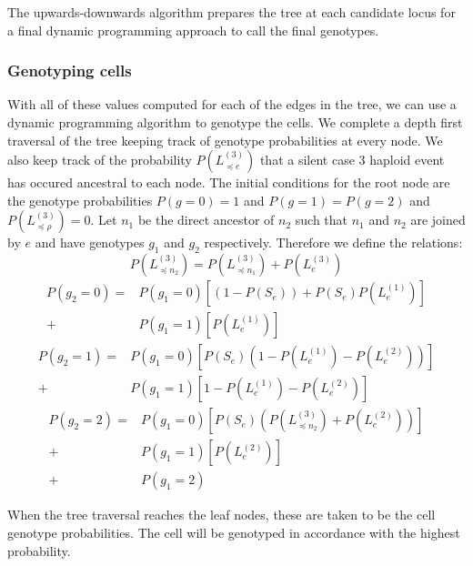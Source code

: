 \documentclass[../../main.tex]{subfiles}
\begin{document}
The upwards-downwards algorithm prepares the tree at each candidate locus for a final dynamic programming approach to call the final genotypes.

\subsubsection*{Genotyping cells}
With all of these values computed for each of the edges in the tree, we can use a dynamic programming algorithm to genotype the cells. We complete a depth first traversal of the tree keeping track of genotype probabilities at every node. We also keep track of the probability $P(L_{\preceq e}^{(3)})$ that a silent case 3 haploid event has occured ancestral to each node. The initial conditions for the root node are the genotype probabilities $P(g=0)=1$ and $P(g=1)=P(g=2)$ and $P(L_{\preceq \rho}^{(3)}) = 0$. Let $n_1$ be the direct ancestor of $n_2$ such that $n_1$ and $n_2$ are joined by $e$ and have genotypes $g_1$ and $g_2$ respectively. Therefore we define the relations:
\begin{equation*}
P(L^{(3)}_{\preceq n_2}) = P(L^{(3)}_{\preceq n_1}) +P(L^{(3)}_e)
\end{equation*}
\begin{align*}
P(g_2 = 0) = &P(g_1=0)\left[(1-P(S_e))+P(S_e)P(L^{(1)}_e)\right]\\
+ &P(g_1 = 1)\left[P(L^{(1)}_e)\right]
\end{align*}
\begin{align*}
P(g_2 = 1) = &P(g_1=0)\left[P(S_e)(1-P(L^{(1)}_e)-P(L^{(2)}_e))\right]\\
+ &P(g_1 = 1)\left[1-P(L^{(1)}_e)-P(L^{(2)}_e)\right]
\end{align*}
\begin{align*}
P(g_2=2) = &P(g_1=0)\left[P(S_e)(P(L^{(3)}_{\preceq n_2}) + P(L^{(2)}_e))\right]\\
+ &P(g_1=1)\left[P(L^{(2)}_e)\right]\\
+ &P(g_1=2)
\end{align*}

When the tree traversal reaches the leaf nodes, these are taken to be the cell genotype probabilities. The cell will be genotyped in accordance with the highest probability.
\end{document}
